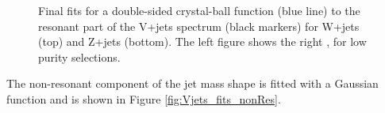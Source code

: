 \begin{figure}[h]
\caption{Final fits for a double-sided crystal-ball function (blue line) to the resonant part of the V+jets spectrum (black markers) for W+jets (top) and Z+jets (bottom). The left figure shows \MJO the right \MJT, for low purity selections. }
\label{fig:Vjets_fits}
\end{figure}
The non-resonant component of the jet mass shape is fitted with a Gaussian function and is shown in Figure \ref{fig:Vjets_fits_nonRes}.
